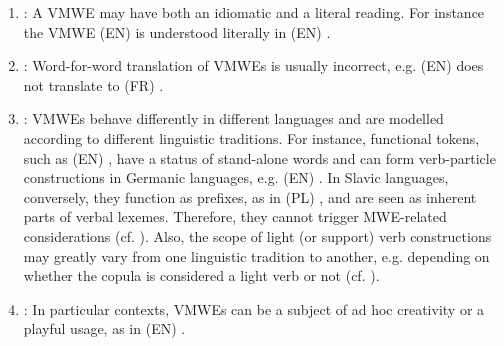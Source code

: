 \documentclass[output=paper,modfonts]{langscibook}
\begin{document}
\begin{enumerate}
\item\label{prop:readings} : A VMWE may have both an idiomatic and a literal reading. For instance the VMWE (EN)  is understood literally in (EN) . 
\item\label{prop:trans}:  Word-for-word translation of VMWEs is usually incorrect, e.g. (EN)  does not translate to (FR) . 
\item\label{prop:multi}: VMWEs behave differently in different languages and are modelled according to different linguistic traditions. For instance, functional tokens, such as (EN) , have a status of stand-alone words and can form verb-particle constructions in Germanic languages, e.g. (EN) . In Slavic languages, conversely, they function as prefixes, as in (PL) , and are seen as inherent parts of verbal lexemes. Therefore, they cannot trigger MWE-related considerations (cf. ). Also, the scope of light (or support) verb constructions may greatly vary from one linguistic tradition to another, e.g. depending on whether the copula  is considered a light verb or not (cf. ).



\item\label{prop:create} : In particular contexts, VMWEs can be a subject of ad hoc creativity or a playful usage, as in (EN) . %
\end{enumerate}
\end{document}
